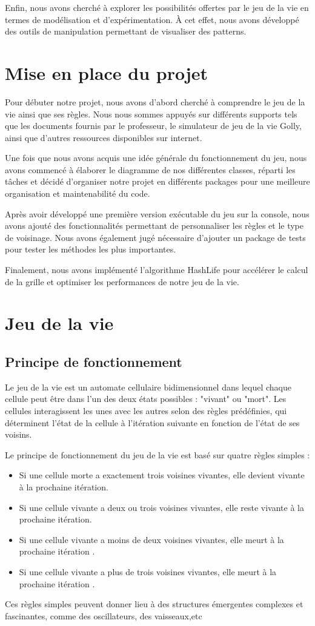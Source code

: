 Enfin, nous avons cherché à explorer les possibilités offertes par le jeu de la vie en termes de modélisation et d'expérimentation. À cet effet, nous avons développé des outils de manipulation permettant de visualiser des patterns.
\section{Mise en place du projet}
Pour débuter notre projet, nous avons d'abord cherché à comprendre le jeu de la vie ainsi que ses règles. Nous nous sommes appuyés sur différents supports tels que les documents fournis par le professeur, le simulateur de jeu de la vie Golly, ainsi que d'autres ressources disponibles sur internet.

Une fois que nous avons acquis une idée générale du fonctionnement du jeu, nous avons commencé à élaborer le diagramme de nos différentes classes, réparti les tâches et décidé d'organiser notre projet en différents packages pour une meilleure organisation et maintenabilité du code.

Après avoir développé une première version exécutable du jeu sur la console, nous avons ajouté des fonctionnalités permettant de personnaliser les règles et le type de voisinage. Nous avons également jugé nécessaire d'ajouter un package de tests pour tester les méthodes les plus importantes.

Finalement, nous avons implémenté l'algorithme HashLife pour accélérer le calcul de la grille et optimiser les performances de notre jeu de la vie.
\section{Jeu de la vie}

\subsection{Principe de fonctionnement}

Le jeu de la vie est un automate cellulaire bidimensionnel dans lequel chaque cellule peut être dans l'un des deux états possibles : "vivant" ou "mort". Les cellules interagissent les unes avec les autres selon des règles prédéfinies, qui déterminent l'état de la cellule à l'itération suivante en fonction de l'état de ses voisins.

Le principe de fonctionnement du jeu de la vie est basé sur quatre règles simples :
\begin{itemize}
\item Si une cellule morte a exactement trois voisines vivantes, elle devient vivante à la prochaine itération.
\item Si une cellule vivante a deux ou trois voisines vivantes, elle reste vivante à la prochaine itération.
\item Si une cellule vivante a moins de deux voisines vivantes, elle meurt à la prochaine itération .
\item Si une cellule vivante a plus de trois voisines vivantes, elle meurt à la prochaine itération .
\end{itemize}

Ces règles simples peuvent donner lieu à des structures émergentes complexes et fascinantes, comme des oscillateurs, des vaisseaux,etc


